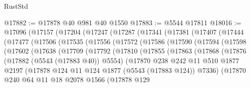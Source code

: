 \begin{lexlean}{RustStd}
\begin{coremodule}
@17882 := @17878 @40 @981 @40 @1550
@17883 := @5544 @17811
@18016 := @17096
    (@17157
      (@17204
        (@17247
          (@17287
            (@17341
              (@17381
                (@17407
                  (@17444
                    (@17477
                      (@17506
                        (@17535
                          (@17556
                            (@17572
                              (@17586
                                (@17590
                                  (@17594
                                    (@17598
                                      (@17602
                                        (@17638
                                          (@17709
                                            (@17792
                                              (@17810
                                                (@17855
                                                  (@17863
                                                    (@17868
                                                      (@17876
                                                        (@17882 (@5543 (@17883 @40)) @5554)
                                                        (@17870
                                                          @238
                                                          @242
                                                          @11
                                                          @510
                                                          @1877
                                                          @2197
                                                          (@17878
                                                            @124
                                                            @11
                                                            @124
                                                            @1877
                                                            (@5543 (@17883 @124))
                                                            @7336)
                                                          (@17870
                                                            @240
                                                            @64
                                                            @11
                                                            @18
                                                            @2078
                                                            @1566
                                                            (@17878
                                                              @129

\end{coremodule}
\end{lexlean}
